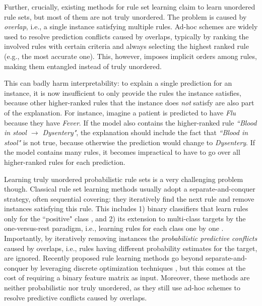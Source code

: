 Further, crucially, existing methods for rule set learning claim to learn unordered rule sets, but most of them are not truly unordered. The problem is caused by \emph{overlap}, i.e., a single instance satisfying multiple rules. Ad-hoc schemes are widely used to resolve prediction conflicts caused by overlaps, typically by ranking the involved rules with certain criteria and always selecting the highest ranked rule \citep{zhang2020diverseRuleSets,lakkaraju2016interpretable} (e.g., the most accurate one). This, however, imposes implicit orders among rules, making them entangled instead of truly unordered. 

This can badly harm interpretability: to explain a single prediction for an instance, it is now insufficient to only provide the rules the instance satisfies, because other higher-ranked rules that the instance does \emph{not} satisfy are also part of the explanation. For instance, imagine a patient is predicted to have \emph{Flu} because they have \emph{Fever}. If the model also contains the higher-ranked rule \emph{``Blood in stool $\rightarrow$ Dysentery"}, the explanation should include the fact that \emph{``Blood in stool"} is not true, because otherwise the prediction would change to \emph{Dysentery}. If the model contains many rules, it becomes impractical to have to go over all higher-ranked rules for each prediction. 

Learning truly unordered probabilistic rule sets is a very challenging problem though. Classical rule set learning methods usually adopt a separate-and-conquer strategy, often sequential covering: they iteratively find the next rule and remove instances satisfying this rule. This includes 1) binary classifiers that learn rules only for the ``positive" class \citep{furnkranz2012foundations}, and 2) its extension to multi-class targets by the one-versus-rest paradigm, i.e., learning rules for each class one by one \citep{cohen1995ripper,clark1991cn2Improve}. Importantly, by iteratively removing instances the \emph{probabilistic predictive conflicts} caused by overlaps, i.e., rules having different probability estimates for the target, are ignored. Recently proposed rule learning methods go beyond separate-and-conquer by leveraging discrete optimization techniques \citep{zhang2020diverseRuleSets,wang2017bayesian,yang2021learning,lakkaraju2016interpretable,dash2018boolean}, but this comes at the cost of requiring a binary feature matrix as input. Moreover, these methods are neither probabilistic nor truly unordered, as they still use ad-hoc schemes to resolve predictive conflicts caused by overlaps. 

